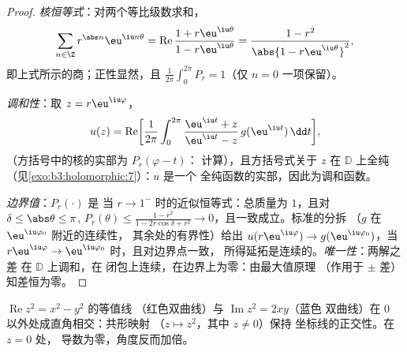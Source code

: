 \begin{proof}
\emph{核恒等式}：对两个等比级数求和，
\[
\sum_{n\in\Z}r^{\abs n}\eu^{\iu n\theta}
= \operatorname{Re}\frac{1 + r\eu^{\iu\theta}}{1 -
r\eu^{\iu\theta}}
= \frac{1 - r^2}{\abs{1 - r\eu^{\iu\theta}}^2},
\]
即上式所示的商；正性显然，且
$\frac1{2\pi}\int_0^{2\pi}P_r = 1$（仅 $n = 0$ 一项保留）。

\emph{调和性}：取 $z = r\eu^{\iu\varphi}$，
\[
u(z) = \operatorname{Re}\biggl[\frac1{2\pi}\int_0^{2\pi}
\frac{\eu^{\iu t} + z}{\eu^{\iu t} - z}\,
g(\eu^{\iu t})\,\dd t\biggr],
\]
（方括号中的核的实部为 $P_r(\varphi - t)$：
计算），且方括号式关于 $z$ 在 $\mathbb D$ 上全纯
（见\cref{exo:b3:holomorphic:7}）：$u$ 是一个
全纯函数的实部，因此为调和函数。

\emph{边界值}：$P_r(\cdot)$ 是
当 $r \to 1^-$ 时的近似恒等式：总质量为 $1$，且对 $\delta \leq
\abs\theta \leq \pi$, $P_r(\theta) \leq \frac{1 - r^2}{1 -
2r\cos\delta + r^2} \to 0$，且一致成立。标准的分拆
（$g$ 在 $\eu^{\iu\varphi_0}$ 附近的连续性，
其余处的有界性）给出 $u(r\eu^{\iu\varphi}) \to
g(\eu^{\iu\varphi_0})$，当 $r\eu^{\iu\varphi} \to
\eu^{\iu\varphi_0}$ 时，且对边界点一致，
所得延拓是连续的。\emph{唯一性}：两解之差
在 $\mathbb D$ 上调和，在
闭包上连续，在边界上为零：由最大值原理
（作用于 $\pm$ 差）知差恒为零。
\end{proof}

\begin{omfigure}

{\small $\operatorname{Re}z^2 = x^2 - y^2$ 的等值线
（红色双曲线）与 $\operatorname{Im}z^2 = 2xy$（蓝色
双曲线）在 $0$ 以外处成直角相交：共形映射
（$z \mapsto z^2$，其中 $z \neq 0$）保持
坐标线的正交性。在 $z = 0$ 处，
导数为零，角度反而加倍。}
\end{omfigure}


